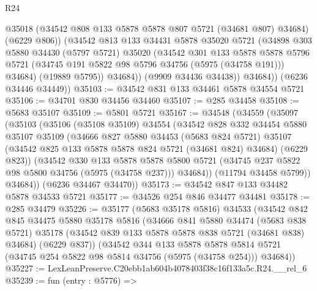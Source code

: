 \begin{lexlean}{R24}
\begin{coremodule}
                @35018
                (@34542 @808 @133 @5878 @5878 @807 @5721 (@34681 @807) @34684)
                (@6229 @806))
              (@34542
                @813
                @133
                @34431
                @5878
                @35020
                @5721
                (@34898
                  @303
                  @5880
                  @34430
                  (@5797 @5721)
                  @35020
                  (@34542
                    @301
                    @133
                    @5878
                    @5878
                    @5796
                    @5721
                    (@34745 @191 @5822 @98 @5796 @34756 (@5975 (@34758 @191)))
                    @34684)
                  (@19889 @5795))
                @34684))
            (@9909 @34436 @34438))
          @34684))
      (@6236 @34446 @34449))
@35103 := @34542 @831 @133 @34461 @5878 @34554 @5721
@35106 := @34701 @830 @34456 @34460
@35107 := @285 @34458
@35108 := @5683 @35107
@35109 := @5801 @5721
@35167 := @34548
    (@34559
      (@35097
        (@35103
          (@35106
            (@35108 @35109)
            @34554
            (@34542
              @828
              @332
              @34454
              @5880
              @35107
              @35109
              (@34666
                @827
                @5880
                @34453
                (@5683 @824 @5721)
                @35107
                (@34542 @825 @133 @5878 @5878 @824 @5721 (@34681 @824) @34684)
                (@6229 @823))
              (@34542
                @330
                @133
                @5878
                @5878
                @5800
                @5721
                (@34745 @237 @5822 @98 @5800 @34756 (@5975 (@34758 @237)))
                @34684))
            (@11794 @34458 @5799))
          @34684))
      (@6236 @34467 @34470))
@35173 := @34542 @847 @133 @34482 @5878 @34533 @5721
@35177 := @34526 @254 @846 @34477 @34481
@35178 := @285 @34479
@35226 := @35177
    (@5683 @35178 @5816)
    @34533
    (@34542
      @842
      @845
      @34475
      @5880
      @35178
      @5816
      (@34666
        @841
        @5880
        @34474
        (@5683 @838 @5721)
        @35178
        (@34542 @839 @133 @5878 @5878 @838 @5721 (@34681 @838) @34684)
        (@6229 @837))
      (@34542
        @344
        @133
        @5878
        @5878
        @5814
        @5721
        (@34745 @254 @5822 @98 @5814 @34756 (@5975 (@34758 @254)))
        @34684))
@35227 := LexLeanPreserve.C20ebb1ab604b4078403f38c16f133a5c.R24.__rel_6
@35239 := fun (entry : @5776) =>

\end{coremodule}
\end{lexlean}
